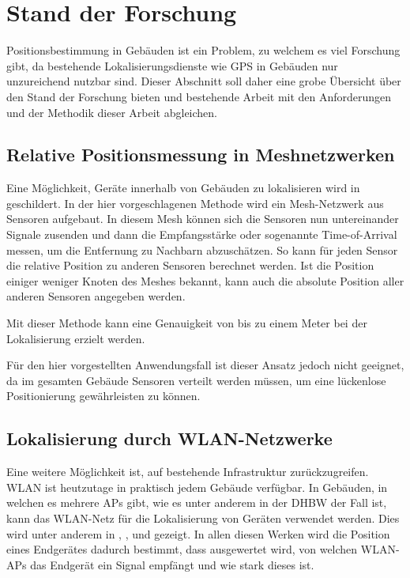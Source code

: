 \section{Stand der Forschung} \label{sec:stand-der-forschung}

Positionsbestimmung in Gebäuden ist ein Problem, zu welchem es viel Forschung gibt, da bestehende
Lokalisierungsdienste wie \gls{GPS} in Gebäuden nur unzureichend nutzbar sind. Dieser Abschnitt soll
daher eine grobe Übersicht über den Stand der Forschung bieten und bestehende Arbeit mit den
Anforderungen und der Methodik dieser Arbeit abgleichen.

\subsection{Relative Positionsmessung in Meshnetzwerken}

Eine Möglichkeit, Geräte innerhalb von Gebäuden zu lokalisieren wird in \cite{Patwari2003}
geschildert. In der hier vorgeschlagenen Methode wird ein Mesh-Netzwerk aus Sensoren aufgebaut.
In diesem Mesh können sich die Sensoren nun untereinander Signale zusenden und dann die
Empfangsstärke oder sogenannte Time-of-Arrival messen, um die Entfernung zu Nachbarn abzuschätzen.
So kann für jeden Sensor die relative Position zu anderen Sensoren berechnet werden.
Ist die Position einiger weniger Knoten des Meshes bekannt, kann auch die absolute Position aller
anderen Sensoren angegeben werden.

Mit dieser Methode kann eine Genauigkeit von bis zu einem Meter bei der Lokalisierung erzielt
werden.

Für den hier vorgestellten Anwendungsfall ist dieser Ansatz jedoch nicht geeignet, da im gesamten
Gebäude Sensoren verteilt werden müssen, um eine lückenlose Positionierung gewährleisten zu können.

\subsection{Lokalisierung durch \gls{WLAN}-Netzwerke}

Eine weitere Möglichkeit ist, auf bestehende Infrastruktur zurückzugreifen. \Gls{WLAN} ist
heutzutage in praktisch jedem Gebäude verfügbar.
In Gebäuden, in welchen es mehrere \glspl{AP} gibt, wie es unter anderem in der \gls{DHBW} der Fall
ist, kann das \gls{WLAN}-Netz für die Lokalisierung von Geräten verwendet werden. Dies wird unter
anderem in \cite{Xiang2004}, \cite{Dong2009}, \cite{Paschalidis2009} und \cite{Liang2009} gezeigt.
In allen diesen Werken wird die Position eines Endgerätes dadurch bestimmt, dass ausgewertet wird,
von welchen \gls{WLAN}-\glspl{AP} das Endgerät ein Signal empfängt und wie stark dieses ist.
